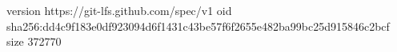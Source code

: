 version https://git-lfs.github.com/spec/v1
oid sha256:dd4c9f183e0df923094d6f1431c43be57f6f2655e482ba99bc25d915846c2bcf
size 372770
